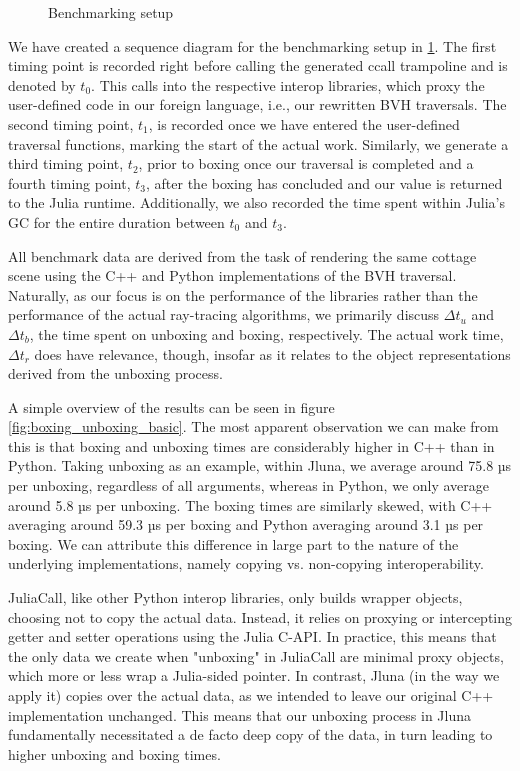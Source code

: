 \begin{figure}[ht!]
  \centering
  
  \caption{Benchmarking setup}
  \label{fig:bechmarking_setup}
  \Description{}
\end{figure}

We have created a sequence diagram for the benchmarking setup in \ref{fig:bechmarking_setup}. The first timing point is recorded right before calling the generated ccall trampoline and is denoted by $t_0$. This calls into the respective interop libraries, which proxy the user-defined code in our foreign language, i.e., our rewritten BVH traversals. The second timing point, $t_1$, is recorded once we have entered the user-defined traversal functions, marking the start of the actual work. Similarly, we generate a third timing point, $t_2$, prior to boxing once our traversal is completed and a fourth timing point, $t_3$, after the boxing has concluded and our value is returned to the Julia runtime. Additionally, we also recorded the time spent within Julia's GC for the entire duration between $t_0$ and $t_3$. 

All benchmark data are derived from the task of rendering the same cottage scene using the C++ and Python implementations of the BVH traversal. Naturally, as our focus is on the performance of the libraries rather than the performance of the actual ray-tracing algorithms, we primarily discuss $\Delta t_u$ and $\Delta t_b$, the time spent on unboxing and boxing, respectively. The actual work time, $\Delta t_r$ does have relevance, though, insofar as it relates to the object representations derived from the unboxing process. 

A simple overview of the results can be seen in figure \ref{fig:boxing_unboxing_basic}. The most apparent observation we can make from this is that boxing and unboxing times are considerably higher in C++ than in Python. Taking unboxing as an example, within Jluna, we average around 75.8 µs per unboxing, regardless of all arguments, whereas in Python, we only average around 5.8 µs per unboxing. The boxing times are similarly skewed, with C++ averaging around 59.3 µs per boxing and Python averaging around 3.1 µs per boxing. We can attribute this difference in large part to the nature of the underlying implementations, namely copying vs. non-copying interoperability. 

JuliaCall, like other Python interop libraries, only builds wrapper objects, choosing not to copy the actual data. Instead, it relies on proxying or intercepting getter and setter operations using the Julia C-API. In practice, this means that the only data we create when "unboxing" in JuliaCall are minimal proxy objects, which more or less wrap a Julia-sided pointer. In contrast, Jluna (in the way we apply it) copies over the actual data, as we intended to leave our original C++ implementation unchanged. This means that our unboxing process in Jluna fundamentally necessitated a de facto deep copy of the data, in turn leading to higher unboxing and boxing times. 


